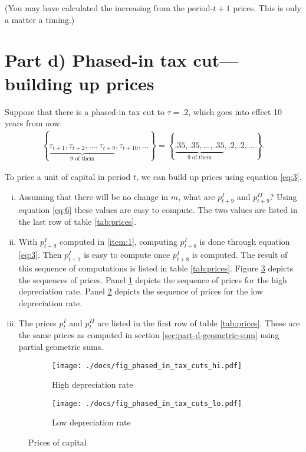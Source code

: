 \documentclass[12pt]{pracjourn_rwr}
\theoremstyle{definition}
\theoremstyle{remark}
\begin{document}
(You may have calculated the increasing from the period-$t+1$ prices.
This is only a matter a timing.)

\section{Part d) Phased-in tax cut---building up prices}

Suppose that there is a phased-in tax cut to $\tau = .2$,
which goes into effect 10 years from now:
\begin{align*}
\left\{ \underbrace{\tau_{t+1},\tau_{t+2},\dots,\tau_{t+9}}_{\text{9 of them}},\tau_{t+10},\dots \right\} =
\left\{ \underbrace{.35, .35, \dots, .35}_{\text{9 of them}},.2, .2,\dots \right\}.
\end{align*}

To price a unit of capital in period $t$,
we can build up prices using equation \eqref{eq:3}.
\begin{enumerate}[i.)]
\item\label{item:1} Assuming that there will be no change in $m$,
what are $p_{t+9}^{I}$ and $p_{t+9}^{II}$?
Using equation \eqref{eq:6} these values are easy to compute.
The two values are listed in the last row of table \ref{tab:prices}.
\item\label{item:2} With $p_{t+9}^{I}$ computed in \ref{item:1},
computing $p_{t+8}^{I}$ is done through equation \eqref{eq:3}.
Then $p_{t+7}^{I}$ is easy to compute once $p_{t+8}^{I}$ is computed.
The result of this sequence of computations is listed in table \ref{tab:prices}.
Figure \ref{fig:prices} depicts the sequences of prices.
Panel \ref{fig:price-hi} depicts the sequence of prices for the high depreciation rate.
Panel \ref{fig:price-low} depicts the sequence of prices for the low depreciation rate. 
\item\label{item:3} The prices $p_{t}^{I}$ and $p_{t}^{II}$ are listed in the first row of table \ref{tab:prices}.
These are the same prices as computed in section \ref{sec:part-d-geometric-sum} using partial geometric sums.
\end{enumerate}



\begin{figure}
\centering
\begin{subfigure}{\textwidth}
\centering
\texttt{[image: ./docs/fig\_phased\_in\_tax\_cuts\_hi.pdf]}
\caption{High depreciation rate}
\label{fig:price-hi}
\end{subfigure}
\begin{subfigure}{\textwidth}
\centering
\texttt{[image: ./docs/fig\_phased\_in\_tax\_cuts\_lo.pdf]}
\caption{Low depreciation rate}
\label{fig:price-low}
\end{subfigure}
\caption{Prices of capital}
\label{fig:prices}
\end{figure}

% 
% 
\end{document}
